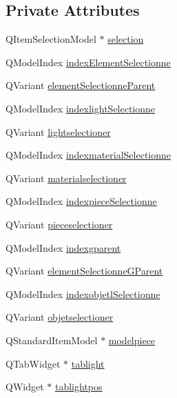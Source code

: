 \subsection*{Private Attributes}
\begin{DoxyCompactItemize}
\item 
Q\+Item\+Selection\+Model $\ast$ \hyperlink{class_mondock_aa0a94c4bfce0d7d4f2547da10d365275}{selection}
\item 
Q\+Model\+Index \hyperlink{class_mondock_a48e5355dbb076ca71a13e42172f342ca}{index\+Element\+Selectionne}
\item 
Q\+Variant \hyperlink{class_mondock_a5a0f5cf7817eee757956874e3bec2043}{element\+Selectionne\+Parent}
\item 
Q\+Model\+Index \hyperlink{class_mondock_ac8fa555c082f94d22d369eed852f93c3}{indexlight\+Selectionne}
\item 
Q\+Variant \hyperlink{class_mondock_a35acbdbc03ccc8bd255083f8499188f5}{lightselectioner}
\item 
Q\+Model\+Index \hyperlink{class_mondock_a8816860ad6351028d8d4e5b022b2b266}{indexmaterial\+Selectionne}
\item 
Q\+Variant \hyperlink{class_mondock_a09fab02186d86e999d23b4f9c667353f}{materialselectioner}
\item 
Q\+Model\+Index \hyperlink{class_mondock_ab950bd39d928049d2788f4690ba45755}{indexpiece\+Selectionne}
\item 
Q\+Variant \hyperlink{class_mondock_acc6d9454fd6ff20be6309e30aa5053c3}{pieceselectioner}
\item 
Q\+Model\+Index \hyperlink{class_mondock_a54452b93781c23fe0e40d764b2d278fe}{indexgparent}
\item 
Q\+Variant \hyperlink{class_mondock_a3c00ae3b69dc59785835aa2d04b73392}{element\+Selectionne\+G\+Parent}
\item 
Q\+Model\+Index \hyperlink{class_mondock_ab7756e9a6862132ca6b86d4b94c834c0}{indexobjetl\+Selectionne}
\item 
Q\+Variant \hyperlink{class_mondock_aba0697efe8eb1eff576ce6599aea10f3}{objetselectioner}
\item 
Q\+Standard\+Item\+Model $\ast$ \hyperlink{class_mondock_a2560c460ea144a4e8b2300dadf8df8ed}{modelpiece}
\item 
Q\+Tab\+Widget $\ast$ \hyperlink{class_mondock_aff9f46d61c662d10837346c496160ed1}{tablight}
\item 
Q\+Widget $\ast$ \hyperlink{class_mondock_af55525ced19bade9444f69f28ceb63bb}{tablightpos}
\item 

\end{DoxyCompactItemize}
